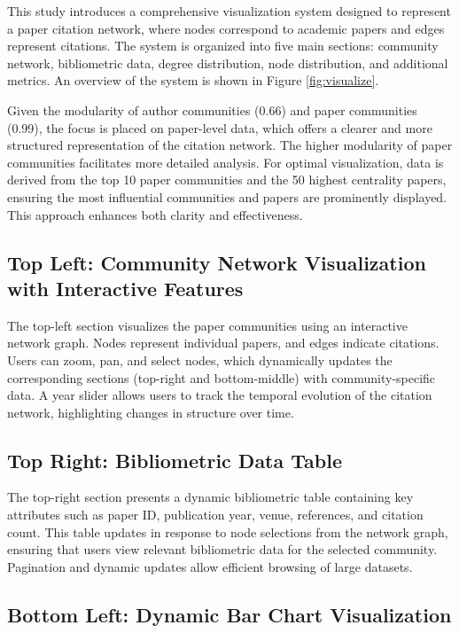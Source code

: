 \documentclass[11pt]{article}
\begin{document}
This study introduces a comprehensive visualization system designed to represent a paper citation network, where nodes correspond to academic papers and edges represent citations. The system is organized into five main sections: community network, bibliometric data, degree distribution, node distribution, and additional metrics. An overview of the system is shown in Figure \ref{fig:visualize}.

Given the modularity of author communities (0.66) and paper communities (0.99), the focus is placed on paper-level data, which offers a clearer and more structured representation of the citation network. The higher modularity of paper communities facilitates more detailed analysis. For optimal visualization, data is derived from the top 10 paper communities and the 50 highest centrality papers, ensuring the most influential communities and papers are prominently displayed. This approach enhances both clarity and effectiveness.

\subsection{Top Left: Community Network Visualization with Interactive Features}

The top-left section visualizes the paper communities using an interactive network graph. Nodes represent individual papers, and edges indicate citations. Users can zoom, pan, and select nodes, which dynamically updates the corresponding sections (top-right and bottom-middle) with community-specific data. A year slider allows users to track the temporal evolution of the citation network, highlighting changes in structure over time.

\subsection{Top Right: Bibliometric Data Table}

The top-right section presents a dynamic bibliometric table containing key attributes such as paper ID, publication year, venue, references, and citation count. This table updates in response to node selections from the network graph, ensuring that users view relevant bibliometric data for the selected community. Pagination and dynamic updates allow efficient browsing of large datasets.

\subsection{Bottom Left: Dynamic Bar Chart Visualization}
\end{document}
